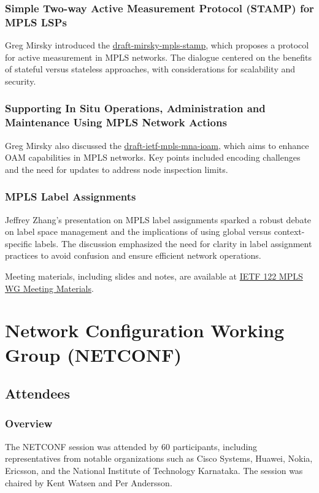 \documentclass{article}
\begin{document}
\subsubsection{Simple Two-way Active Measurement Protocol (STAMP) for MPLS LSPs}
Greg Mirsky introduced the \href{https://datatracker.ietf.org/doc/draft-mirsky-mpls-stamp}{draft-mirsky-mpls-stamp}, which proposes a protocol for active measurement in MPLS networks. The dialogue centered on the benefits of stateful versus stateless approaches, with considerations for scalability and security.

\subsubsection{Supporting In Situ Operations, Administration and Maintenance Using MPLS Network Actions}
Greg Mirsky also discussed the \href{https://datatracker.ietf.org/doc/draft-ietf-mpls-mna-ioam}{draft-ietf-mpls-mna-ioam}, which aims to enhance OAM capabilities in MPLS networks. Key points included encoding challenges and the need for updates to address node inspection limits.

\subsubsection{MPLS Label Assignments}
Jeffrey Zhang's presentation on MPLS label assignments sparked a robust debate on label space management and the implications of using global versus context-specific labels. The discussion emphasized the need for clarity in label assignment practices to avoid confusion and ensure efficient network operations.

\noindent Meeting materials, including slides and notes, are available at \href{https://datatracker.ietf.org/meeting/122/session/mpls/}{IETF 122 MPLS WG Meeting Materials}.




\newpage

\section{Network Configuration Working Group (NETCONF)}

\subsection{Attendees}
\subsubsection{Overview}
The NETCONF session was attended by 60 participants, including representatives from notable organizations such as Cisco Systems, Huawei, Nokia, Ericsson, and the National Institute of Technology Karnataka. The session was chaired by Kent Watsen and Per Andersson.
\end{document}
